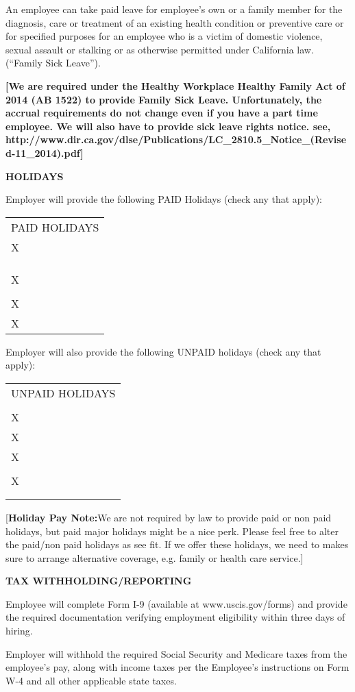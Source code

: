 \documentclass[]{article}
\begin{document}
An employee can take paid leave for employee's own or a family member
for the diagnosis, care or treatment of an existing health condition or
preventive care or for specified purposes for an employee who is a
victim of domestic violence, sexual assault or stalking or as otherwise
permitted under California law. (``Family Sick Leave'').

\textbf{{[}We are required under the Healthy Workplace Healthy Family
Act of 2014 (AB 1522) to provide Family Sick Leave. Unfortunately, the
accrual requirements do not change even if you have a part time
employee. We will also have to provide sick leave rights notice. see,
http://www.dir.ca.gov/dlse/Publications/LC\_2810.5\_Notice\_(Revised-11\_2014).pdf{]}}

\textbf{HOLIDAYS}

Employer will provide the following PAID Holidays (check any that
apply):

\begin{longtable}[c]{@{}l@{}}
\toprule
PAID HOLIDAYS\tabularnewline
X\tabularnewline
\tabularnewline
\tabularnewline
\tabularnewline
X\tabularnewline
\tabularnewline
X\tabularnewline
X\tabularnewline
\bottomrule
\end{longtable}

Employer will also provide the following UNPAID holidays (check any that
apply):

\begin{longtable}[c]{@{}l@{}}
\toprule
UNPAID HOLIDAYS\tabularnewline
\tabularnewline
X\tabularnewline
X\tabularnewline
X\tabularnewline
\tabularnewline
X\tabularnewline
\tabularnewline
\tabularnewline
\bottomrule
\end{longtable}

{[}\textbf{Holiday Pay Note:}We are not required by law to provide paid
or non paid holidays, but paid major holidays might be a nice perk.
Please feel free to alter the paid/non paid holidays as see fit. If we
offer these holidays, we need to makes sure to arrange alternative
coverage, e.g. family or health care service.{]}

\textbf{TAX WITHHOLDING/REPORTING}

Employee will complete Form I-9 (available at www.uscis.gov/forms) and
provide the required documentation verifying employment eligibility
within three days of hiring.

Employer will withhold the required Social Security and Medicare taxes
from the employee's pay, along with income taxes per the Employee's
instructions on Form W-4 and all other applicable state taxes.
\end{document}
